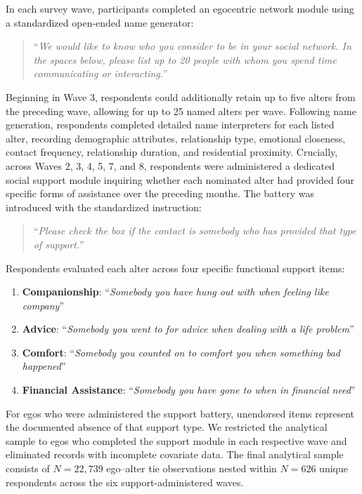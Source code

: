 \documentclass[12pt]{article}
\begin{document}
In each survey wave, participants completed an egocentric network module using a standardized open-ended name generator: 

\begin{quote}
``\textit{We would like to know who you consider to be in your social network. In the spaces below, please list up to 20 people with whom you spend time communicating or interacting.}'' 
\end{quote}

Beginning in Wave 3, respondents could additionally retain up to five alters from the preceding wave, allowing for up to 25 named alters per wave. Following name generation, respondents completed detailed name interpreters for each listed alter, recording demographic attributes, relationship type, emotional closeness, contact frequency, relationship duration, and residential proximity. Crucially, across Waves 2, 3, 4, 5, 7, and 8, respondents were administered a dedicated social support module inquiring whether each nominated alter had provided four specific forms of assistance over the preceding months. The battery was introduced with the standardized instruction:
\begin{quote}
``\textit{Please check the box if the contact is somebody who has provided that type of support.}''
\end{quote}
Respondents evaluated each alter across four specific functional support items:
\begin{enumerate}
  \item \textbf{Companionship}: ``\textit{Somebody you have hung out with when feeling like company}''
  \item \textbf{Advice}: ``\textit{Somebody you went to for advice when dealing with a life problem}''
  \item \textbf{Comfort}: ``\textit{Somebody you counted on to comfort you when something bad happened}''
  \item \textbf{Financial Assistance}: ``\textit{Somebody you have gone to when in financial need}''
\end{enumerate}

For egos who were administered the support battery, unendorsed items represent the documented absence of that support type. We restricted the analytical sample to egos who completed the support module in each respective wave and eliminated records with incomplete covariate data. The final analytical sample consists of $N = 22,739$ ego--alter tie observations nested within $N = 626$ unique respondents across the six support-administered waves.
\end{document}
